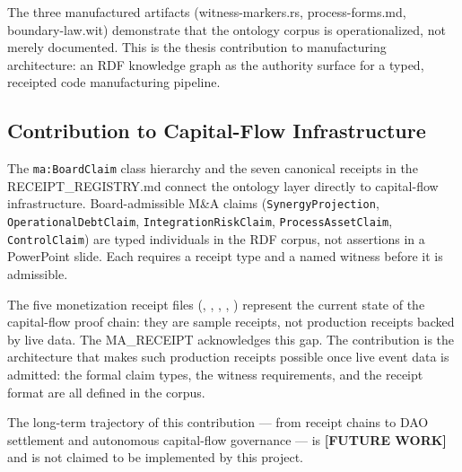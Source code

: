 The three manufactured artifacts (witness-markers.rs, process-forms.md, boundary-law.wit)
demonstrate that the ontology corpus is operationalized, not merely documented. This is
the thesis contribution to manufacturing architecture: an RDF knowledge graph as the
authority surface for a typed, receipted code manufacturing pipeline.

\subsection{Contribution to Capital-Flow Infrastructure}
\label{sec:research-open-ontologies-contrib-capital}

The \texttt{ma:BoardClaim} class hierarchy and the seven canonical receipts in the
RECEIPT\_REGISTRY.md connect the ontology layer directly to capital-flow infrastructure.
Board-admissible M\&A claims (\texttt{SynergyProjection}, \texttt{OperationalDebtClaim},
\texttt{IntegrationRiskClaim}, \texttt{ProcessAssetClaim}, \texttt{ControlClaim}) are
typed individuals in the RDF corpus, not assertions in a PowerPoint slide. Each requires
a receipt type and a named witness before it is admissible.

The five monetization receipt files (,
, ,
, ) represent
the current state of the capital-flow proof chain: they are sample receipts, not production
receipts backed by live data. The MA\_RECEIPT acknowledges this gap. The contribution is the
architecture that makes such production receipts possible once live event data is admitted:
the formal claim types, the witness requirements, and the receipt format are all defined in
the corpus.

The long-term trajectory of this contribution --- from receipt chains to DAO settlement and
autonomous capital-flow governance --- is \textbf{[FUTURE WORK]} and is not claimed to be
implemented by this project.
